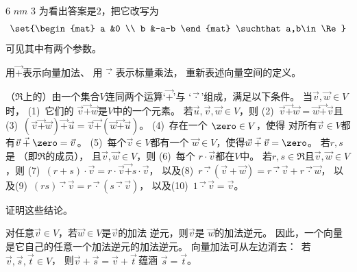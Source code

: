     \begin{answer}
      \begin{exparts}
        \partsitem \( 6 \)
        \partsitem \( nm \)
        \partsitem \( 3 \)
        \partsitem 为看出答案是\( 2 \)，把它改写为
        \begin{equation*}
          \set{\begin{mat}
            a  &0  \\
            b  &-a-b
          \end{mat} \suchthat a,b\in\Re}
        \end{equation*}
        可见其中有两个参数。
      \end{exparts}  
     \end{answer}
  \item 
    用\( \vec{+} \)表示向量加法、
    用\( \,\vec{\cdot}\, \)表示标量乘法，
    重新表述向量空间的定义。
    \begin{answer}
      {
      \def\plus{\mathbin{\vec{+}}}
      \def\tim{\mathbin{\vec{\cdot}}}
        （\( \Re \)上的）由一个集合\( V \)连同两个运算`\( \plus \)'与
        `\( \tim \)'组成，满足以下条件。
        当\( \vec{v},\vec{w}\in V \)时， 
        (1)~它们的
          \( \vec{v}\plus\vec{w} \)是\( V \)中的一个元素。
        若\( \vec{u},\vec{v},\vec{w}\in V \)，则 
        (2)~\( \vec{v}\plus\vec{w}=\vec{w}\plus\vec{v} \)且 
        (3)~\( (\vec{v}\plus\vec{w})\plus\vec{u}
                 =\vec{v}\plus(\vec{w}\plus\vec{u}) \)。
        (4)~存在一个
          \( \zero\in V \)，使得
          对所有\( \vec{v}\in V\)都有\( \vec{v}\plus\zero=\vec{v}\, \)。
        (5)~每个\( \vec{v}\in V \)都有一个
          \( \vec{w}\in V \)，使得\( \vec{w}\plus\vec{v}=\zero \)。
        若\( r,s \)是
        （即\( \Re \)的成员），
        且\( \vec{v},\vec{w}\in V \)，则 
        (6)~每个
           \( r\cdot\vec{v} \)都在\( V \)中。
        若\( r,s\in\Re \)且\( \vec{v},\vec{w}\in V \)，则
        (7)~\( (r+ s)\cdot\vec{v}=r\cdot\vec{v}\plus s\cdot\vec{v} \)， 
        以及(8)~\( r\tim (\vec{v}+\vec{w})
           =r\tim\vec{v}+r\tim\vec{w} \)，
        以及(9)~\( (rs)\tim \vec{v} =r\tim (s\tim\vec{v}) \)，
        以及(10)~\( 1\tim \vec{v}=\vec{v} \)。
     }
    \end{answer}
  \item 
    证明这些结论。
    \begin{exparts}
      \partsitem 对任意$\vec{v}\in V$，若$\vec{w}\in V$是$\vec{v}$的加法 
        逆元，则$\vec{v}$是
        $\vec{w}$的加法逆元。
        因此，一个向量是它自己的任意一个加法逆元的加法逆元。
      \partsitem 向量加法可从左边消去：~若 
        \( \vec{v},\vec{s},\vec{t}\in V \)，
        则\( \vec{v}+\vec{s}=\vec{v}+\vec{t}\, \)蕴涵
        \( \vec{s}=\vec{t} \)。
    \end{exparts}
